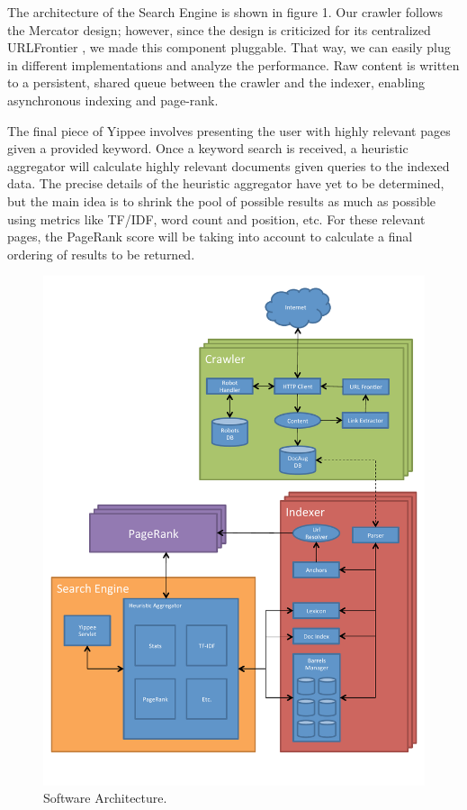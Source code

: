 \documentclass[11pt, letterpaper, oneside, twocolumn]{article}
\begin{document}
The architecture of the Search Engine  is shown in figure 1. Our crawler
follows the Mercator design\cite{mercator}; however, since the design is
criticized for its centralized URLFrontier \cite{ubi,para}, we made this
component pluggable. That  way, we can easily plug in different implementations 
and analyze the  performance.  Raw content  is  written to a persistent, shared queue  
between the crawler and  the indexer, enabling
asynchronous indexing and page-rank.

The final piece of Yippee involves presenting the user with highly relevant pages given a provided keyword. Once a keyword search is received, a heuristic aggregator will calculate highly relevant documents given queries to the indexed data. The precise details of the heuristic aggregator have yet to be determined, but the main idea is to shrink the pool of possible results as much as possible using metrics like TF/IDF, word count and position, etc.  For these relevant pages, the PageRank score will be taking into account to calculate a final ordering of results to be returned.

\label{sec:SOAR} %
\begin{figure}[!b]
  \centering
  \includegraphics[scale=0.50]{figures/yippee_map.pdf}
  \caption{Software Architecture.}
\end{figure}
\end{document}
